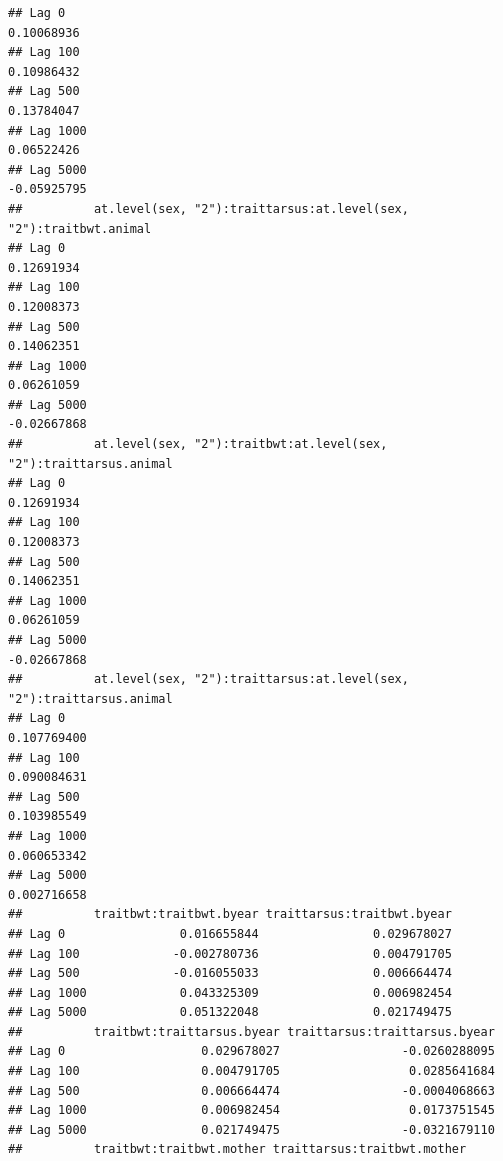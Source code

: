 \documentclass[
  12pt,
]{book}
\begin{document}
\begin{verbatim}
## Lag 0                                                        0.10068936
## Lag 100                                                      0.10986432
## Lag 500                                                      0.13784047
## Lag 1000                                                     0.06522426
## Lag 5000                                                    -0.05925795
##          at.level(sex, "2"):traittarsus:at.level(sex, "2"):traitbwt.animal
## Lag 0                                                           0.12691934
## Lag 100                                                         0.12008373
## Lag 500                                                         0.14062351
## Lag 1000                                                        0.06261059
## Lag 5000                                                       -0.02667868
##          at.level(sex, "2"):traitbwt:at.level(sex, "2"):traittarsus.animal
## Lag 0                                                           0.12691934
## Lag 100                                                         0.12008373
## Lag 500                                                         0.14062351
## Lag 1000                                                        0.06261059
## Lag 5000                                                       -0.02667868
##          at.level(sex, "2"):traittarsus:at.level(sex, "2"):traittarsus.animal
## Lag 0                                                             0.107769400
## Lag 100                                                           0.090084631
## Lag 500                                                           0.103985549
## Lag 1000                                                          0.060653342
## Lag 5000                                                          0.002716658
##          traitbwt:traitbwt.byear traittarsus:traitbwt.byear
## Lag 0                0.016655844                0.029678027
## Lag 100             -0.002780736                0.004791705
## Lag 500             -0.016055033                0.006664474
## Lag 1000             0.043325309                0.006982454
## Lag 5000             0.051322048                0.021749475
##          traitbwt:traittarsus.byear traittarsus:traittarsus.byear
## Lag 0                   0.029678027                 -0.0260288095
## Lag 100                 0.004791705                  0.0285641684
## Lag 500                 0.006664474                 -0.0004068663
## Lag 1000                0.006982454                  0.0173751545
## Lag 5000                0.021749475                 -0.0321679110
##          traitbwt:traitbwt.mother traittarsus:traitbwt.mother

\end{verbatim}
\end{document}
